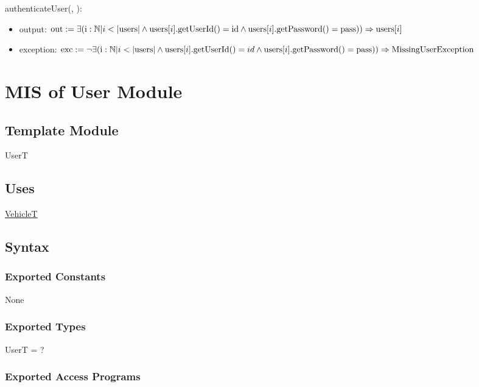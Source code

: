 \documentclass[12pt, titlepage]{article}
\begin{document}
\noindent authenticateUser(, ):
\begin{itemize}
\item output: $\text{out} := \exists (\text{i} : \mathbb{N} | i < |\text{users}|
\land \text{users}[i].\text{getUserId}() = \\ \text{id} \land
\text{users}[i].\text{getPassword}() = \text{pass})) \Rightarrow
\text{users}[i]$

\item exception: $\text{exc} := \neg \exists (\text{i} : \mathbb{N} | i <
|\text{users}| \land \text{users}[i].\text{getUserId}() = \\ id \land
\text{users}[i].\text{getPassword}() = \text{pass})) \Rightarrow
\text{MissingUserException}$
\end{itemize}

\newpage

\section{MIS of User Module} 
\label{user:Module}

\subsection{Template Module}
UserT

\subsection{Uses}
\hyperref[vehicle:Module]{VehicleT}

\subsection{Syntax}

\subsubsection{Exported Constants}
None

\subsubsection{Exported Types}
UserT = ?

\subsubsection{Exported Access Programs}
\end{document}

